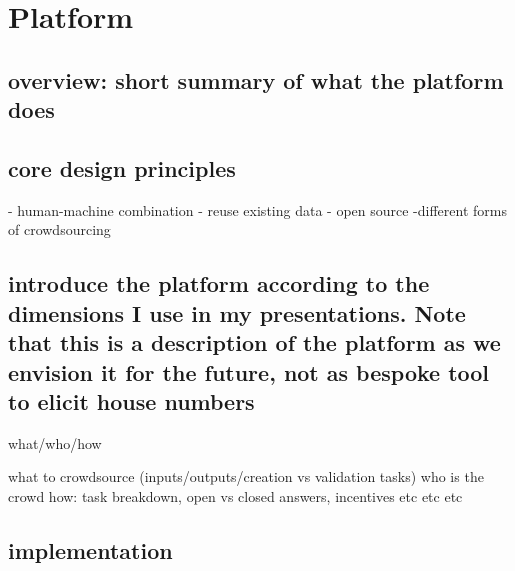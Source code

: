 \section{Platform}

\subsection{overview: short summary of what the platform does}

\subsection{core design principles}

- human-machine combination 
- reuse existing data
- open source
-different forms of crowdsourcing

\subsection{introduce the platform according to the dimensions I use in my presentations. Note that this is a description of the platform as we envision it for the future, not as bespoke tool to elicit house numbers}

what/who/how

what to crowdsource (inputs/outputs/creation vs validation tasks)
who is the crowd 
how: task breakdown, open vs closed answers, incentives etc etc etc

\subsection{implementation}